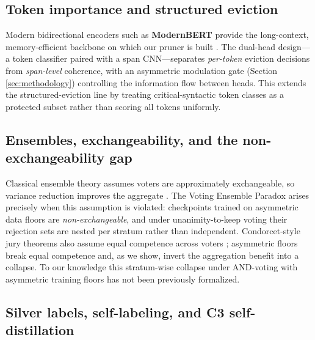 \subsection{Token importance and structured eviction}
\label{sec:rw:importance}

Modern bidirectional encoders such as \textbf{ModernBERT} provide the
long-context, memory-efficient backbone on which our pruner is built
\citep{warner2024modernbert}. The dual-head design---a token classifier
paired with a span CNN---separates \emph{per-token} eviction decisions from
\emph{span-level} coherence, with an asymmetric modulation gate (Section
\ref{sec:methodology}) controlling the information flow between heads. This
extends the structured-eviction line by treating critical-syntactic token
classes as a protected subset rather than scoring all tokens uniformly.

\subsection{Ensembles, exchangeability, and the non-exchangeability gap}
\label{sec:rw:ensembles}

Classical ensemble theory assumes voters are approximately exchangeable, so
variance reduction improves the aggregate
\citep{dietterich2000ensemble,breiman1996bagging}. The Voting Ensemble Paradox
arises precisely when this assumption is violated: checkpoints trained on
asymmetric data floors are \emph{non-exchangeable}, and under unanimity-to-keep
voting their rejection sets are nested per stratum rather than independent.
Condorcet-style jury theorems also assume equal competence across voters
\citep{condorcet1785}; asymmetric floors break equal competence and, as we
show, invert the aggregation benefit into a collapse. To our knowledge this
stratum-wise collapse under AND-voting with asymmetric training floors has not
been previously formalized.

\subsection{Silver labels, self-labeling, and C3 self-distillation}
\label{sec:rw:selflabel}

